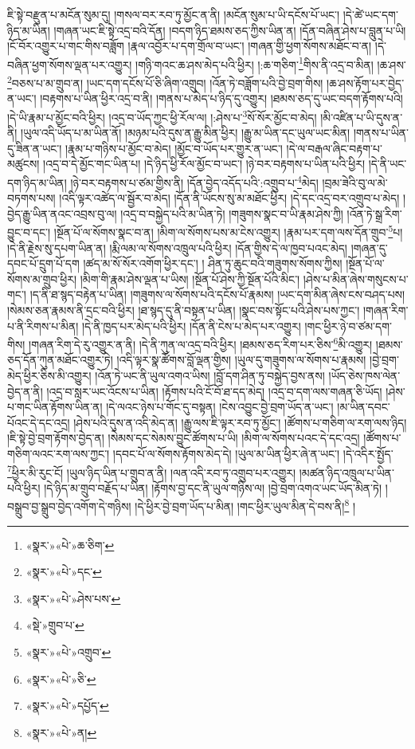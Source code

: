ཇི་སྟེ་བརྫུན་པ་མངོན་སུམ་དུ། །གསལ་བར་རབ་ཏུ་མྱོང་ན་ནི། །མངོན་སུམ་པ་ཡི་དངོས་པོ་ཡང་། །དེ་ཚེ་ཡང་དག་ཉིད་མ་ཡིན། །གཞན་ཡང་ཇི་སྟེ་འདྲ་བའི་དོན། །བདག་ཉིད་ཐམས་ཅད་ཀྱིས་ཡིན་ན། །དོན་བཞིན་ཤེས་པ་བླུན་པ་ཡི། །ངོ་བོར་འགྱུར་པ་གང་གིས་བཟློག །རྣལ་འབྱོར་པ་དག་གྲོལ་བ་ཡང་། །གཞན་གྱི་ཕྱག་སོགས་མཐོང་བ་ན། །དེ་བཞིན་ཕྱག་སོགས་ལྡན་པར་འགྱུར། །གཉི་གའང་ཆ་ཤས་མེད་པའི་ཕྱིར། །:ཆ་གཅིག་\footnote{«སྣར་»«པེ་»ཆ་ཅིག་}གིས་ནི་འདྲ་བ་མིན། །ཆ་ཤས་\footnote{«སྣར་»«པེ་»དང་}བཅས་པ་མ་གྲུབ་ན། །ཡང་དག་དངོས་པོ་ཅི་ཞིག་འགྲུབ། །འོན་ཏེ་བཟློག་པའི་བྱེ་བྲག་གིས། །ཆ་ཤས་རྟོག་པར་བྱེད་ན་ཡང་། །བརྟགས་པ་ཡིན་ཕྱིར་འདྲ་བ་ནི། །གནས་པ་མེད་པ་ཉིད་དུ་འགྱུར། །ཐམས་ཅད་དུ་ཡང་བདག་རྟོགས་པའི། །དེ་ཡི་རྣམ་པ་མྱོང་བའི་ཕྱིར། །འདྲ་བ་ཡོད་ཀྱང་ཕྱི་རོལ་ལ། །:ཤེས་པ་\footnote{«སྣར་»«པེ་»ཤེས་པས་}སོ་སོར་མྱོང་བ་མེད། །མི་འཛིན་པ་ཡི་དུས་ན་ནི། །ཡུལ་འདི་ཡོད་པ་མ་ཡིན་ནོ། །མཉམ་པའི་དུས་ན་རྒྱུ་མིན་ཕྱིར། །རྒྱུ་མ་ཡིན་དང་ཡུལ་ཡང་མིན། །གནས་པ་ཡིན་དུ་ཟིན་ན་ཡང་། །རྣམ་པ་གཉིས་པ་མྱོང་བ་མེད། །མྱོང་བ་ཡོད་པར་གྱུར་ན་ཡང་། །དེ་ལ་བརྒལ་ཞིང་བརྟག་པ་མཚུངས། །འདྲ་བ་དེ་མྱོང་གང་ཡིན་པ། །དེ་ཉིད་ཕྱི་རོལ་མྱོང་བ་ཡང་། །ཉེ་བར་བརྟགས་པ་ཡིན་པའི་ཕྱིར། །དེ་ནི་ཡང་དག་ཉིད་མ་ཡིན། །ཉེ་བར་བརྟགས་པ་ཙམ་གྱིས་ནི། །དོན་བྱེད་འདོད་པའི་:འགྲུབ་པ་\footnote{«སྡེ་»གྲུབ་པ་}མེད། །བྲམ་ཟེའི་བུ་ལ་མེ་བཏགས་པས། །འདི་ལྟར་འཚེད་ལ་སྦྱོར་བ་མེད། །དོན་ནི་ཡོངས་སུ་མ་མཐོང་ཕྱིར། །དེ་དང་འདྲ་བར་འགྲུབ་པ་མེད། །བྱེད་རྒྱུ་ཡིན་ནའང་འབྲས་བུ་ལ། །འདྲ་བ་བསྐྱེད་པའི་མ་ཡིན་ཏེ། །གཟུགས་སྣང་བ་ཡི་རྣམ་ཤེས་ཀྱི། །འོན་ཏེ་སྒྲ་རིག་བྱུང་བ་དང་། །སྔོན་པོ་ལ་སོགས་སྣང་བ་ན། །མིག་ལ་སོགས་པས་མ་ངེས་འགྱུར། །རྣམ་པར་དག་ལས་དོན་གྲུབ་\footnote{«སྣར་»«པེ་»འགྲུབ་}པ། །དེ་ནི་རྗེས་སུ་དཔག་ཡིན་ན། །རྨི་ལམ་ལ་སོགས་འཁྲུལ་པའི་ཕྱིར། །དོན་གྱིས་དེ་ལ་ཁྱབ་པའང་མེད། །གཞན་དུ་དབང་པོ་དྲུག་པོ་དག །ཚད་མ་སོ་སོར་འགོག་ཕྱིར་དང་། །
ཤིན་ཏུ་ཆུང་བའི་གཟུགས་སོགས་ཀྱིས། །སྔོན་པོ་ལ་སོགས་མ་གྲུབ་ཕྱིར། །མིག་གི་རྣམ་ཤེས་ལྡན་པ་ཡིས། །སྔོན་པོ་ཤེས་ཀྱི་སྔོན་པོའི་མིང་། །ཤེས་པ་མིན་ཞེས་གསུངས་པ་གང་། །ད་ནི་ཐ་སྙད་བརྟེན་པ་ཡིན། །གཟུགས་ལ་སོགས་པའི་དངོས་པོ་རྣམས། །ཡང་དག་མིན་ཞེས་ངས་བཤད་པས། །སེམས་ཅན་རྣམས་ནི་དྲང་བའི་ཕྱིར། །ཐ་སྙད་དུ་ནི་བསྟན་པ་ཡིན། །སྣང་བས་སྟོང་པའི་ཤེས་པས་ཀྱང་། །གཞན་རིག་པ་ནི་རིགས་པ་མིན། །དེ་ནི་ཁྱད་པར་མེད་པའི་ཕྱིར། །དོན་ནི་ངེས་པ་མེད་པར་འགྱུར། །གང་ཕྱིར་ཉེ་བ་ཙམ་དག་གིས། །གཞན་རིག་དེ་རུ་འགྱུར་ན་ནི། །དེ་ནི་ཀུན་ལ་འདྲ་བའི་ཕྱིར། །ཐམས་ཅད་རིག་པར་ཅིས་\footnote{«སྣར་»«པེ་»ཅི་}མི་འགྱུར། །ཐམས་ཅད་དོན་ཀུན་མཐོང་འགྱུར་ཏེ། །འདི་ལྟར་སྣ་ཚོགས་བློ་ལྡན་གྱིས། །ཡུལ་དུ་གཟུགས་ལ་སོགས་པ་རྣམས། །བྱེ་བྲག་མེད་ཕྱིར་ཅིས་མི་འགྱུར། །འོན་ཏེ་ཡང་ནི་ཡུལ་འགའ་ཡིས། །བློ་དག་ཤིན་ཏུ་བསྐྱེད་བྱས་ནས། །ཡོད་ཅེས་ཁས་ལེན་བྱེད་ན་ནི། །འདྲ་བ་སླར་ཡང་འོངས་པ་ཡིན། །རྟོགས་པའི་ངོ་བོ་ཐ་དད་མེད། །འདྲ་བ་དག་ལས་གཞན་ཅི་ཡོད། །ཤེས་པ་གང་ཡིན་རྟོགས་ཡིན་ན། །དེ་ལའང་ཉེས་པ་གོང་དུ་བསྟན། །ངེས་འབྱུང་བྱེ་བྲག་ཡོད་ན་ཡང་། །མ་ཡིན་དབང་པོའང་དེ་དང་འདྲ། །ཤེས་པའི་དུས་ན་འདི་མེད་ན། །རྒྱུ་ལས་ཇི་ལྟར་རབ་ཏུ་མྱོང་། །ཚོགས་པ་གཅིག་ལ་རག་ལས་ཉིད། །ཇི་སྟེ་བྱེ་བྲག་རྟོགས་བྱེད་ན། །སེམས་དང་སེམས་བྱུང་ཚོགས་པ་ཡི། །མིག་ལ་སོགས་པའང་དེ་དང་འདྲ། །ཚོགས་པ་གཅིག་ལའང་རག་ལས་ཀྱང་། །དབང་པོ་ལ་སོགས་རྟོགས་མེད་དེ། །ཡུལ་མ་ཡིན་ཕྱིར་ཞེ་ན་ཡང་། །དེ་འདིར་སྤྱོད་\footnote{«སྣར་»«པེ་»དཔྱོད་}ཕྱིར་མི་རུང་ངོ། །ཡུལ་ཉིད་ཡིན་པ་གྲུབ་ན་ནི། །ལན་འདི་རབ་ཏུ་འགྲུབ་པར་འགྱུར། །མཚན་ཉིད་འཁྲུལ་པ་ཡིན་པའི་ཕྱིར། །དེ་ཉིད་མ་གྲུབ་བརྗོད་པ་ཡིན། །རྟོགས་བྱ་དང་ནི་ཡུལ་གཉིས་ལ། །བྱེ་བྲག་འགའ་ཡང་ཡོད་མིན་ཏེ། །བསྒྲུབ་བྱ་སྒྲུབ་བྱེད་འགོག་དེ་གཉིས། །དེ་ཕྱིར་བྱེ་བྲག་ཡོད་པ་མིན། །གང་ཕྱིར་ཡུལ་མིན་དེ་བས་ནི།\footnote{«སྣར་»«པེ་»ན།} །
